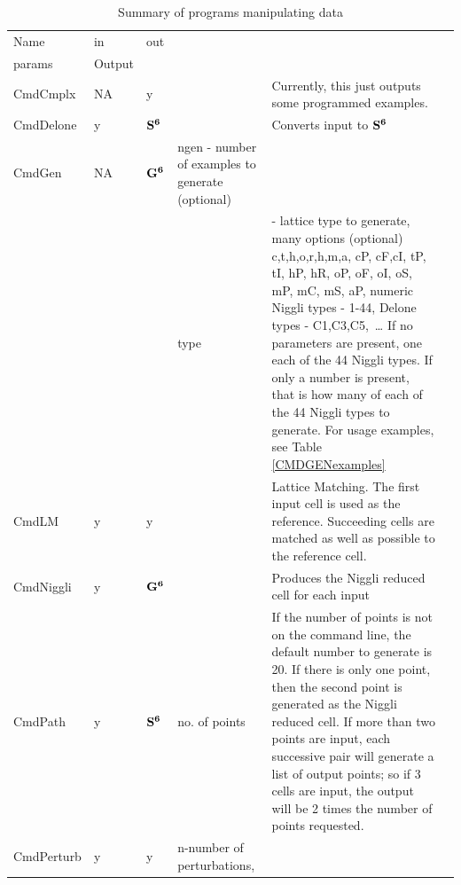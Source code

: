 \documentclass[preprint]{iucr}              %
\numberwithin{equation}{section}
\newcommand{\SVI}[0]{$\bf{S^{6}}$}
\newcommand{\GVI}[0]{$\bf{G^{6}}$}
\begin{document}
		\begin{longtable}{l l l p{} p{} l}
			\caption{Summary of programs manipulating data}
			\label{processingprogs}\\ %
			\toprule
			Name		&	in	&	out		&	\begin{parbox}[t]{2cm}{
				command line\\
				param{s}}
			\end{parbox}	& Output	\\
			\midrule
			CmdCmplx	&	NA	&	y		&\hrulefill	&Currently, 
				this just outputs some programmed examples.		\\[.9pt]
			CmdDelone	&	y	&	\SVI{}	&\hrulefill	&Converts input to \SVI{}		\\[.9pt]
			CmdGen		&	NA	&	\GVI{}	&	ngen - number of examples to generate (optional)\\
				{}		&		&			&type		& - lattice type to 
				generate, many options (optional) 
				c,t,h,o,r,h,m,a, 
				cP, cF,cI, tP, tI, hP, hR, oP, oF, oI, oS, mP, mC, mS, aP, 
				numeric Niggli types - 1-44, 
				Delone types - C1,C3,C5,~\dots 
				If no parameters are present, one each of the 44 Niggli types. 
				If only a number is present, that is how many of each of the 44 Niggli types to generate.
				For usage examples, see Table \ref{CMDGENexamples}\\[.9pt]
			CmdLM		&	y	&	y		&	\hrulefill		&		Lattice Matching. 
				The first input cell is used as the reference. 
				Succeeding cells are matched 
				as well as possible to the reference cell.\\[.9pt]
			CmdNiggli	&	y	&	\GVI{}	&\hrulefill	&		
				Produces the Niggli reduced cell for 	each input\\[.9pt]
			CmdPath		&	y	& \SVI{}			&
			no. of points	& If the number of points is 
			not on the command line, the default number 
			to generate is 20.	If there is only one point, 
			then the second point is generated as the 
			Niggli reduced cell. If more than two points are input, 
			each successive pair will
			generate a list of output points; so if
			3 cells are input, the output will be 
			2 times the number of points requested.	\\[.9pt]
			CmdPerturb	&	y	& y			&	n-number of perturbations, 
			

\end{longtable}
\end{document}
